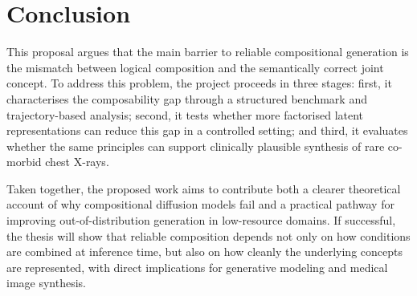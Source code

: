 
\chapter{Conclusion}
\label{chap:conclusion}

This proposal argues that the main barrier to reliable compositional generation is the mismatch
between logical composition and the semantically correct joint concept. To address this problem,
the project proceeds in three stages: first, it characterises the composability gap
through a structured benchmark and trajectory-based analysis; second, it tests whether more
factorised latent representations can reduce this gap in a controlled setting; and third, it
evaluates whether the same principles can support clinically plausible synthesis of rare
co-morbid chest X-rays.

Taken together, the proposed work aims to contribute both a clearer theoretical account of why
compositional diffusion models fail and a practical pathway for improving out-of-distribution
generation in low-resource domains. If successful, the thesis will show that reliable composition
depends not only on how conditions are combined at inference time, but also on how cleanly the
underlying concepts are represented, with direct implications for generative modeling and medical
image synthesis.
